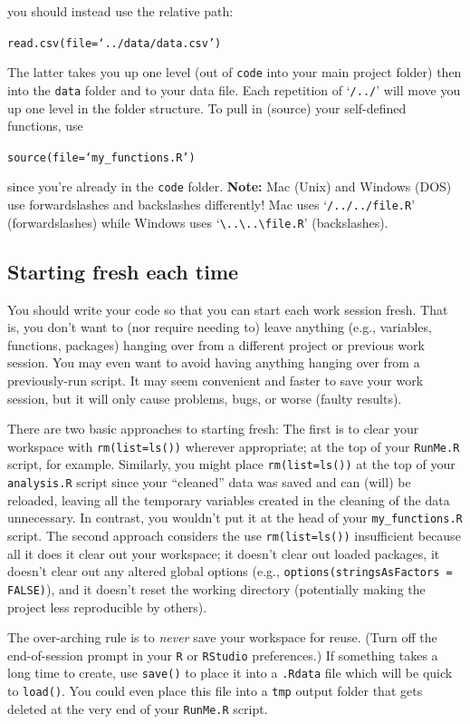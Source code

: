 \documentclass[12pt,letterpaper]{article}
\begin{document}
\noindent
you should instead use the relative path:

\texttt{read.csv(file=`../data/data.csv')}

\noindent
The latter takes you up one level (out of \texttt{code} into your main project 
folder) then into the \texttt{data} folder and to your data file.
Each repetition of `\texttt{/../}' will move you up one level in the folder structure.
To pull in (source) your self-defined functions, use

\texttt{source(file=`my\_functions.R')}

\noindent
since you're already in the \texttt{code} folder.
\textbf{Note:} Mac (Unix) and Windows (DOS) use forwardslashes and backslashes differently!  Mac uses `\texttt{/../../file.R}' (forwardslashes) while Windows uses `\texttt{\textbackslash..\textbackslash..\textbackslash file.R}' (backslashes).


\subsection{Starting fresh each time}
You should write your code so that you can start each work session fresh.
That is, you don't want to (nor require needing to) leave anything (e.g., variables, functions, packages) hanging over from a different project or previous work session.
You may even want to avoid having anything hanging over from a previously-run script.
It may seem convenient and faster to save your work session, but it will only cause problems, bugs, or worse (faulty results).

There are two basic approaches to starting fresh:
The first is to clear your workspace with \texttt{rm(list=ls())} wherever appropriate;
at the top of your \texttt{RunMe.R} script, for example.
Similarly, you might place \texttt{rm(list=ls())} at the top of your \texttt{analysis.R} script since your ``cleaned'' data was saved and can (will) be reloaded, leaving all the temporary variables created in the cleaning of the data unnecessary.
In contrast, you wouldn't put it at the head of your \texttt{my\_functions.R} script.
The second approach considers the use \texttt{rm(list=ls())} insufficient because all it does it clear out your workspace;
it doesn't clear out loaded packages,
it doesn't clear out any altered global options (e.g., \texttt{options(stringsAsFactors = FALSE)}),
and it doesn't reset the working directory (potentially making the project less reproducible by others).

The over-arching rule is to \emph{never} save your workspace for reuse.
(Turn off the end-of-session prompt in your \texttt{R} or \texttt{RStudio} preferences.)
If something takes a long time to create, use \texttt{save()} to place it into a \texttt{.Rdata} file which will be quick to \texttt{load()}. You could even place this file into a \texttt{tmp} output folder that gets deleted at the very end of your \texttt{RunMe.R} script.
\end{document}
